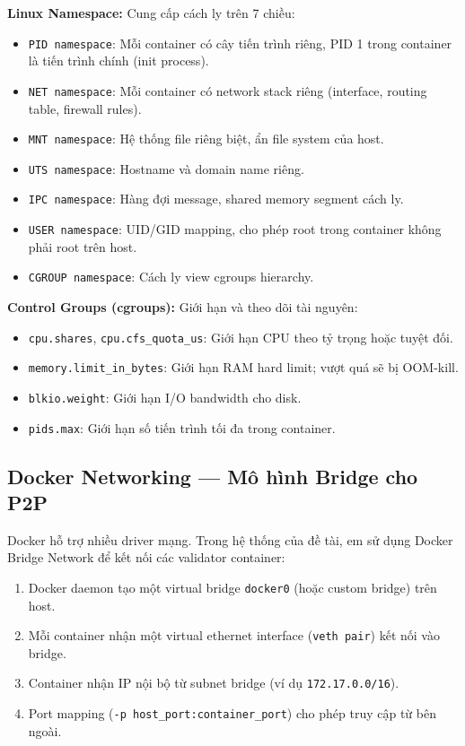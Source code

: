\textbf{Linux Namespace:} Cung cấp cách ly trên 7 chiều:
\begin{itemize}
    \item \texttt{PID namespace}: Mỗi container có cây tiến trình riêng, PID 1 trong container là tiến trình chính (init process).
    \item \texttt{NET namespace}: Mỗi container có network stack riêng (interface, routing table, firewall rules).
    \item \texttt{MNT namespace}: Hệ thống file riêng biệt, ẩn file system của host.
    \item \texttt{UTS namespace}: Hostname và domain name riêng.
    \item \texttt{IPC namespace}: Hàng đợi message, shared memory segment cách ly.
    \item \texttt{USER namespace}: UID/GID mapping, cho phép root trong container không phải root trên host.
    \item \texttt{CGROUP namespace}: Cách ly view cgroups hierarchy.
\end{itemize}

\textbf{Control Groups (cgroups):} Giới hạn và theo dõi tài nguyên:
\begin{itemize}
    \item \texttt{cpu.shares}, \texttt{cpu.cfs\_quota\_us}: Giới hạn CPU theo tỷ trọng hoặc tuyệt đối.
    \item \texttt{memory.limit\_in\_bytes}: Giới hạn RAM hard limit; vượt quá sẽ bị OOM-kill.
    \item \texttt{blkio.weight}: Giới hạn I/O bandwidth cho disk.
    \item \texttt{pids.max}: Giới hạn số tiến trình tối đa trong container.
\end{itemize}

\subsection{Docker Networking --- Mô hình Bridge cho P2P}

Docker hỗ trợ nhiều driver mạng. Trong hệ thống của đề tài, em sử dụng Docker Bridge Network để kết nối các validator container:

\begin{enumerate}
    \item Docker daemon tạo một virtual bridge \texttt{docker0} (hoặc custom bridge) trên host.
    \item Mỗi container nhận một virtual ethernet interface (\texttt{veth pair}) kết nối vào bridge.
    \item Container nhận IP nội bộ từ subnet bridge (ví dụ \texttt{172.17.0.0/16}).
    \item Port mapping (\texttt{-p host\_port:container\_port}) cho phép truy cập từ bên ngoài.
\end{enumerate}

